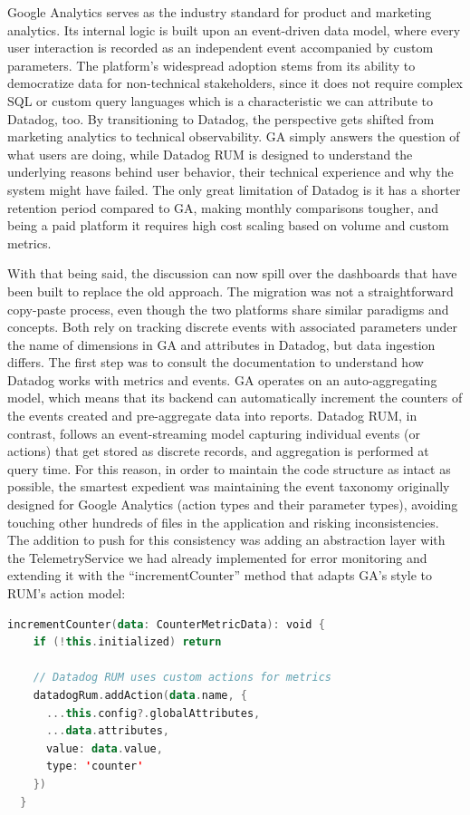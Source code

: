 \documentclass[12pt,a4paper,openright,twoside]{book}
\begin{document}
Google Analytics serves as the industry standard for product and marketing analytics. Its internal logic is built upon an event-driven data model, where every user interaction is recorded as an independent event accompanied by custom parameters. The platform’s widespread adoption stems from its ability to democratize data for non-technical stakeholders, since it does not require complex SQL or custom query languages which is a characteristic we can attribute to Datadog, too. 
By transitioning to Datadog, the perspective gets shifted from marketing analytics to technical observability. GA simply answers the question of what users are doing, while Datadog RUM is designed to understand the underlying reasons behind user behavior, their technical experience and why the system might have failed. The only great limitation of Datadog is it has a shorter retention period compared to GA, making monthly comparisons tougher, and being a paid platform it requires high cost scaling based on volume and custom metrics. 

With that being said, the discussion can now spill over the dashboards that have been built to replace the old approach. The migration was not a straightforward copy-paste process, even though the two platforms share similar paradigms and concepts. Both rely on tracking discrete events with associated parameters under the name of dimensions in GA and attributes in Datadog, but data ingestion differs. 
The first step was to consult the documentation to understand how Datadog works with metrics and events. GA operates on an auto-aggregating model, which means that its backend can automatically increment the counters of the events created and pre-aggregate data into reports. Datadog RUM, in contrast, follows an event-streaming model capturing individual events (or actions) that get stored as discrete records, and aggregation is performed at query time. For this reason, in order to maintain the code structure as intact as possible, the smartest expedient was maintaining the event taxonomy originally designed for Google Analytics (action types and their parameter types), avoiding touching other hundreds of files in the application and risking inconsistencies. The addition to push for this consistency was adding an abstraction layer with the TelemetryService we had already implemented for error monitoring and extending it with the ``incrementCounter'' method that adapts GA's style to RUM's action model:

\begin{lstlisting}[language=Kotlin, caption={incrementCounter adapter method for RUM custom actions}, label=lst:incrCountAdapt]
    incrementCounter(data: CounterMetricData): void {
    if (!this.initialized) return

    // Datadog RUM uses custom actions for metrics
    datadogRum.addAction(data.name, {
      ...this.config?.globalAttributes,
      ...data.attributes,
      value: data.value,
      type: 'counter'
    })
  }
\end{lstlisting}
\end{document}
